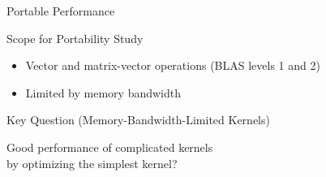 

\begin{frame}{Portable Performance}

  \begin{block}{Scope for Portability Study}
    \begin{itemize}
     \item Vector and matrix-vector operations (BLAS levels 1 and 2)
     \item Limited by memory bandwidth
    \end{itemize}
  \end{block}

  \begin{block}{Key Question (Memory-Bandwidth-Limited Kernels)}
    \begin{center} \color{red} \LARGE
     Good performance of complicated kernels \\
     by optimizing the simplest kernel?
    \end{center}
  \end{block}

\end{frame}


